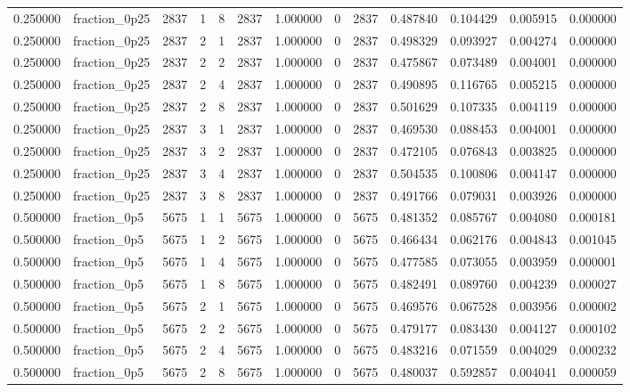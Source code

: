 \begin{tabular}{rlrrrrrrrrrrr}
0.250000 & fraction\_0p25 & 2837 & 1 & 8 & 2837 & 1.000000 & 0 & 2837 & 0.487840 & 0.104429 & 0.005915 & 0.000000 \\
0.250000 & fraction\_0p25 & 2837 & 2 & 1 & 2837 & 1.000000 & 0 & 2837 & 0.498329 & 0.093927 & 0.004274 & 0.000000 \\
0.250000 & fraction\_0p25 & 2837 & 2 & 2 & 2837 & 1.000000 & 0 & 2837 & 0.475867 & 0.073489 & 0.004001 & 0.000000 \\
0.250000 & fraction\_0p25 & 2837 & 2 & 4 & 2837 & 1.000000 & 0 & 2837 & 0.490895 & 0.116765 & 0.005215 & 0.000000 \\
0.250000 & fraction\_0p25 & 2837 & 2 & 8 & 2837 & 1.000000 & 0 & 2837 & 0.501629 & 0.107335 & 0.004119 & 0.000000 \\
0.250000 & fraction\_0p25 & 2837 & 3 & 1 & 2837 & 1.000000 & 0 & 2837 & 0.469530 & 0.088453 & 0.004001 & 0.000000 \\
0.250000 & fraction\_0p25 & 2837 & 3 & 2 & 2837 & 1.000000 & 0 & 2837 & 0.472105 & 0.076843 & 0.003825 & 0.000000 \\
0.250000 & fraction\_0p25 & 2837 & 3 & 4 & 2837 & 1.000000 & 0 & 2837 & 0.504535 & 0.100806 & 0.004147 & 0.000000 \\
0.250000 & fraction\_0p25 & 2837 & 3 & 8 & 2837 & 1.000000 & 0 & 2837 & 0.491766 & 0.079031 & 0.003926 & 0.000000 \\
0.500000 & fraction\_0p5 & 5675 & 1 & 1 & 5675 & 1.000000 & 0 & 5675 & 0.481352 & 0.085767 & 0.004080 & 0.000181 \\
0.500000 & fraction\_0p5 & 5675 & 1 & 2 & 5675 & 1.000000 & 0 & 5675 & 0.466434 & 0.062176 & 0.004843 & 0.001045 \\
0.500000 & fraction\_0p5 & 5675 & 1 & 4 & 5675 & 1.000000 & 0 & 5675 & 0.477585 & 0.073055 & 0.003959 & 0.000001 \\
0.500000 & fraction\_0p5 & 5675 & 1 & 8 & 5675 & 1.000000 & 0 & 5675 & 0.482491 & 0.089760 & 0.004239 & 0.000027 \\
0.500000 & fraction\_0p5 & 5675 & 2 & 1 & 5675 & 1.000000 & 0 & 5675 & 0.469576 & 0.067528 & 0.003956 & 0.000002 \\
0.500000 & fraction\_0p5 & 5675 & 2 & 2 & 5675 & 1.000000 & 0 & 5675 & 0.479177 & 0.083430 & 0.004127 & 0.000102 \\
0.500000 & fraction\_0p5 & 5675 & 2 & 4 & 5675 & 1.000000 & 0 & 5675 & 0.483216 & 0.071559 & 0.004029 & 0.000232 \\
0.500000 & fraction\_0p5 & 5675 & 2 & 8 & 5675 & 1.000000 & 0 & 5675 & 0.480037 & 0.592857 & 0.004041 & 0.000059 \\

\end{tabular}
